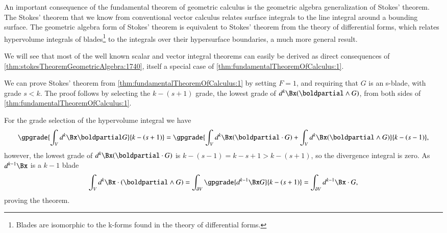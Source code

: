 %
%
An important consequence of the fundamental theorem of geometric calculus is the
geometric algebra generalization of Stokes' theorem.
The Stokes' theorem that we know from conventional vector calculus relates
 surface integrals to the line integral around a bounding surface.
The geometric algebra form of Stokes' theorem is equivalent to Stokes' theorem from the theory of differential forms, which relates
hypervolume integrals of blades\footnote{Blades are isomorphic to the k-forms found in the theory of differential forms.} to the integrals over their hypersurface boundaries, a much more general result.



We will see that most of the well known scalar and vector integral theorems can easily be derived as direct consequences of \cref{thm:stokesTheoremGeometricAlgebra:1740}, itself a special case of \cref{thm:fundamentalTheoremOfCalculus:1}.

We can prove Stokes' theorem
from \cref{thm:fundamentalTheoremOfCalculus:1}
by setting \( F = 1 \), and requiring that \( G \)
is an s-blade, with grade \( s < k \).
The proof follows by selecting the \( k-(s+1) \) grade, the lowest grade of \( d^k \Bx (\boldpartial \wedge G) \), from both sides of \cref{thm:fundamentalTheoremOfCalculus:1}.

For the grade selection of the hypervolume integral we have
\begin{dmath}\label{eqn:stokesTheoremTheStatement:100}
\gpgrade{ \int_V d^k \Bx \boldpartial G }{k-(s+1)}
=
\gpgrade{
\int_V d^k \Bx (\boldpartial \cdot G )
+
\int_V d^k \Bx (\boldpartial \wedge G )
}{k-(s-1)},
\end{dmath}
however, the lowest grade of \( d^k \Bx (\boldpartial \cdot G ) \) is \( k -(s-1) = k - s + 1 > k - (s+1) \), so the divergence integral is zero.  As \( d^{k-1} \Bx \) is a \( k - 1 \) blade
\begin{dmath}\label{eqn:stokesTheoremTheStatement:110}
\int_V d^k \Bx \cdot (\boldpartial \wedge G )
= \int_{\partial V} \gpgrade{d^{k-1} \Bx G}{k-(s+1)}
= \int_{\partial V} d^{k-1} \Bx \cdot G,
\end{dmath}
proving the theorem.

